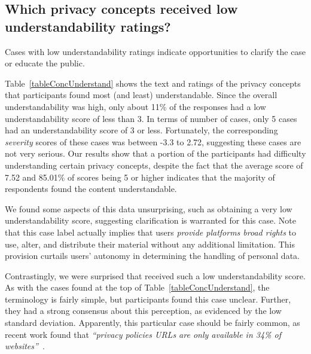 {%
\subsection{Which privacy concepts received low understandability ratings?}
\label{secUnderstandabilityHiLo}




Cases with low understandability ratings indicate opportunities to clarify the case or educate the public.
} %
Table~\ref{tableConcUnderstand} shows the text and ratings of the privacy concepts that participants found most (and least) understandable.
Since the overall understandability was high, only about 11\% of the responses had a low understandability score of less than 3.
In terms of number of cases, only 5 cases had an understandability score of 3 or less.
Fortunately, the corresponding \textit{severity} scores of these cases was between -3.3 to 2.72, suggesting these cases are not very serious.
Our results show that a portion of the participants had difficulty understanding certain privacy concepts, despite the fact that the average score of 7.52 and 85.01\% of scores being 5 or higher indicates that the majority of respondents found the content understandable.


We found some aspects of this data unsurprising, such as  obtaining a very low understandability score, suggesting clarification is warranted for this case.
Note that this case label actually implies that users \textit{provide platforms broad rights} to use, alter, and distribute their material without any additional limitation.
This provision curtails users' autonomy in determining the handling of personal data.


Contrastingly, we were surprised that  received such a low understandability score.
As with the cases found at the top of Table~\ref{tableConcUnderstand}, the terminology is fairly simple, but participants found this case unclear.
Further, they had a strong consensus about this perception, as evidenced by the low standard deviation.
Apparently, this particular case should be fairly common, as recent work found that \textit{``privacy policies URLs are only available in 34\% of websites''}~\cite{srinath2023lost}.

